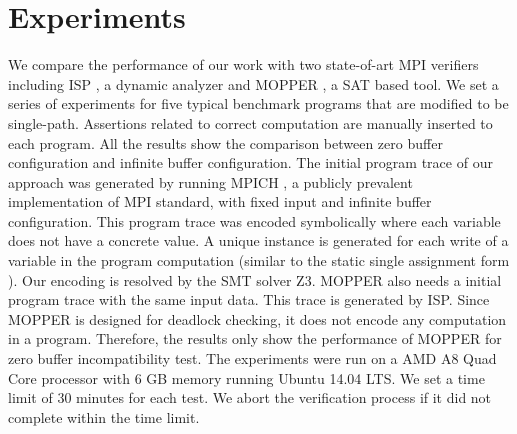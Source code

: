 \section{Experiments}
We compare the performance of our work with two state-of-art MPI verifiers including ISP \cite{DBLP:conf/ppopp/VakkalankaSGK08,DBLP:conf/sbmf/SharmaGB12}, a dynamic analyzer and MOPPER \cite{DBLP:conf/fm/ForejtKNS14}, a SAT based tool. 
We set a series of experiments for five typical benchmark programs that are modified to be single-path. Assertions related to correct computation are manually inserted to each program. All the results show the comparison between zero buffer configuration and infinite buffer configuration. The initial program trace of our approach was generated by running MPICH \cite{mpich}, a publicly prevalent implementation of MPI standard, with fixed input and infinite buffer configuration. This program trace was encoded symbolically where each variable does not have a concrete value. A unique instance is generated for each write of a variable in the program computation (similar to the static single assignment form \cite{DBLP:journals/toplas/CytronFRWZ91}). Our encoding is resolved by the SMT solver Z3. MOPPER also needs a initial program trace with the same input data. This trace is generated by ISP. Since MOPPER is designed for deadlock checking, it does not encode any computation in a program. Therefore, the results only show the performance of MOPPER for zero buffer incompatibility test. The experiments were run on a AMD A8 Quad Core processor with 6 GB memory running Ubuntu 14.04 LTS. We set a time limit of 30 minutes for each test. We abort the verification process if it did not complete within the time limit. 


